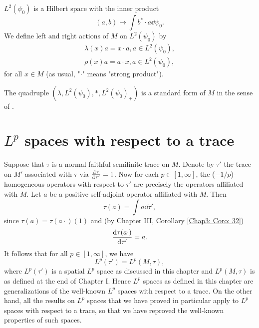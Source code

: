 \begin{proposition}
    $L^2(\psi_0)$ is a Hilbert space with the inner product
    \[
        (a,b)\mapsto \int b^*\cdot a\dd \psi_0.
    \]
    We define left and right actions of $M$ on $L^2(\psi_0)$ by
    \[
        \begin{split}
            \lambda(x)a=x\cdot a,a\in L^2(\psi_0),\\
            \rho(x)a=a\cdot x,a\in L^2(\psi_0),
        \end{split}
    \]
    for all $x\in M$ (as usual, "$\cdot$" means "strong product").
\end{proposition}
\begin{proposition}
    The quadruple $(\lambda,L^2(\psi_0),*,L^2(\psi_0)_+)$ is a standard form of $M$ in the sense of \cite{4}.
\end{proposition}
\section{$L^p$ spaces with respect to a trace}
Suppose that $\tau$ is a normal faithful semifinite trace on $M$. Denote by $\tau'$ the trace on $M'$ associated with $\tau$ via $\dv{\tau}{\tau'}= 1$. Now for each $p\in [1,\infty]$, the ($-1/p$)-homogeneous operators with respect to $\tau'$ are precisely the operators affiliated with $M$. Let $a$ be a positive self-adjoint operator affiliated with $M$. Then
\begin{equation}
    \tau(a)=\int a\dd \tau',
\end{equation}
since $\tau(a)=\tau(a\cdot)(1)$ and (by Chapter III, Corollary \ref{Chap3: Coro: 32})
\begin{equation}
    \dv{\tau(a\cdot)}{\tau'}=a.
\end{equation}
It follows that for all $p\in[1,\infty]$, we have
\begin{equation}
    L^p(\tau')=L^p(M,\tau),
\end{equation}
where $L^p(\tau')$ is a spatial $L^p$ space as discussed in this chapter and $L^p(M,\tau)$ is as defined at the end of Chapter I. Hence $L^p$ spaces as defined in this chapter are generalizations of the well-known $L^p$ spaces with respect to a trace. On the other hand, all the results on $L^p$ spaces that we have proved in particular apply to $L^p$ spaces with respect to a trace, so that we have reproved the well-known properties of such spaces.
